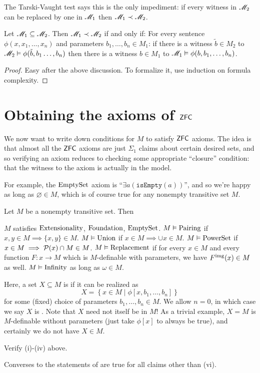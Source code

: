 The Tarski-Vaught test says this is the only impediment:
if every witness in $\mathscr M_2$ can be replaced by one in $\mathscr M_1$ then $\mathscr M_1 \prec \mathscr M_2$.
\begin{lemma}
	Let $\mathscr M_1 \subseteq \mathscr M_2$.
	Then $\mathscr M_1 \prec \mathscr M_2$ if and only if:
	For every sentence $\phi(x, x_1, \dots, x_n)$ and parameters
	$b_1, \dots, b_n \in M_1$:
	if there is a witness $\tilde b \in M_2$
	to $\mathscr M_2 \vDash \phi(\tilde b, b_1 \dots, b_n)$
	then there is a witness $b \in M_1$ to $\mathscr M_1 \vDash \phi(b, b_1, \dots, b_n)$.
\end{lemma}
\begin{proof}
	Easy after the above discussion.
	To formalize it, use induction on formula complexity.
\end{proof}

\section{Obtaining the axioms of $\mathsf{ZFC}$}
We now want to write down conditions for $M$ to satisfy $\mathsf{ZFC}$ axioms.
The idea is that almost all the $\mathsf{ZFC}$ axioms are just $\Sigma_1$
claims about certain desired sets,
and so verifying an axiom reduces to checking some appropriate ``closure'' condition:
that the witness to the axiom is actually in the model.

For example, the $\mathrm{EmptySet}$ axiom is ``$\exists a (\mathtt{isEmpty}(a))$'',
and so we're happy as long as $\varnothing \in M$, which is of course
true for any nonempty transitive set $M$.

\begin{lemma}
	\label{lem:transitive_ZFC}
	Let $M$ be a nonempty transitive set. Then
	\begin{enumerate}[(i)]
		\ii $M$ satisfies $\mathrm{Extensionality}$, $\mathrm{Foundation}$, $\mathrm{EmptySet}$.
		\ii $M \vDash \mathrm{Pairing}$ if $x,y \in M \implies \{x,y\} \in M$.
		\ii $M \vDash \mathrm{Union}$ if $x \in M \implies \cup x \in M$.
		\ii $M \vDash \mathrm{PowerSet}$ if $x \in M \implies \mathcal P(x) \cap M \in M$.
		\ii $M \vDash \mathrm{Replacement}$ if for every $x \in M$
		and every function $F \colon x \to M$
		which is $M$-definable with parameters,
		we have $F^{\text{img}}(x) \in M$ as well.
		\ii $M \vDash \mathrm{Infinity}$ as long as $\omega \in M$.
	\end{enumerate}
\end{lemma}
Here, a set $X \subseteq M$ is 
if it can be realized as
\[ X = \left\{ x \in M \mid \phi[x, b_1, \dots, b_n] \right\} \]
for some (fixed) choice of parameters $b_1,\dots,b_n \in M$.
We allow $n=0$, in which case we say $X$ is .
Note that $X$ need not itself be in $M$!
As a trivial example, $X = M$ is $M$-definable without parameters
(just take $\phi[x]$ to always be true), and certainly we do not have $X \in M$.
\begin{exercise}
	Verify (i)-(iv) above.
\end{exercise}
\begin{remark}
	Converses to the statements of 
	are true for all claims other than (vi).
\end{remark}


